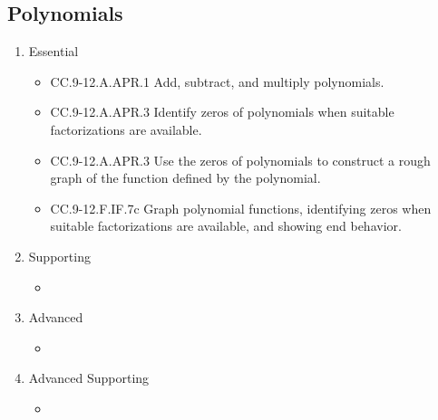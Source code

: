 \documentclass{article}
\begin{document}
\subsection*{Polynomials}
\begin{enumerate}
	\item Essential
	\begin{itemize}
		\item CC.9-12.A.APR.1  Add, subtract, and multiply polynomials.
		\item CC.9-12.A.APR.3  Identify zeros of polynomials when suitable factorizations are available.
		\item CC.9-12.A.APR.3  Use the zeros of polynomials to construct a rough graph of the function defined by the polynomial.
		\item CC.9-12.F.IF.7c Graph polynomial functions, identifying zeros when suitable factorizations are available, and showing end behavior.
	\end{itemize}		
	\item Supporting
	\begin{itemize}
		\item
	\end{itemize}
	\item Advanced
	\begin{itemize}
		\item
	\end{itemize}
	\item Advanced Supporting
	\begin{itemize}
		\item
	\end{itemize}
\end{enumerate}
\end{document}
